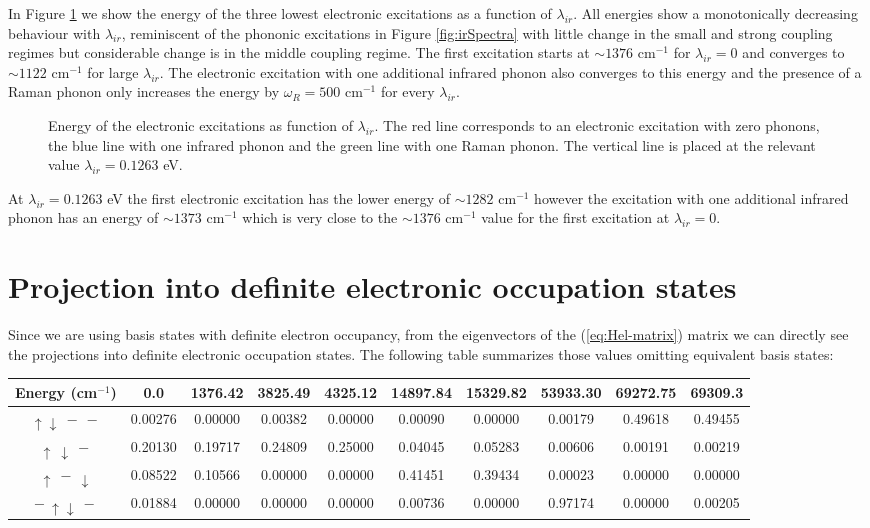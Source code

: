 In Figure \ref{fig:electrSpectra} we show the energy of the three lowest electronic excitations as a function of $\lambda_{ir}$.
All energies show a monotonically decreasing behaviour with $\lambda_{ir}$, reminiscent of the phononic excitations in Figure \ref{fig:irSpectra} with little change in the small and strong coupling regimes but considerable change is in the middle coupling regime.
The first excitation starts at $\sim 1376$ cm$^{-1}$ for $\lambda_{ir}=0$ and converges to $\sim 1122$ cm$^{-1}$ for large $\lambda_{ir}$.
The electronic excitation with one additional infrared phonon also converges to this energy and the presence of a Raman phonon only increases the energy by $\omega_R=500$ cm$^{-1}$ for every $\lambda_{ir}$.
%
\begin{figure}[ht]
  \centering
  
  \caption[Energy of the electronic excitations as function of $\lambda_{ir}$.]
  {Energy of the electronic excitations as function of $\lambda_{ir}$. 
    The red line corresponds to an electronic excitation with zero phonons, the blue line with one infrared phonon and the green line with one Raman phonon.
    The vertical line is placed at the relevant value $\lambda_{ir}=0.1263$ eV.}
  \label{fig:electrSpectra}
\end{figure}

At $\lambda_{ir}=0.1263$ eV the first electronic excitation has the lower energy of $\sim 1282$ cm$^{-1}$ however the excitation with one additional infrared phonon has an energy of $\sim 1373$ cm$^{-1}$ which is very close to the $\sim 1376$ cm$^{-1}$ value for the first excitation at $\lambda_{ir}=0$.

\section{Projection into definite electronic occupation states}

Since we are using basis states with definite electron occupancy, from the eigenvectors of the (\ref{eq:Hel-matrix}) matrix we can directly see the projections into definite electronic occupation states. The following table summarizes those values omitting equivalent basis states:

\noindent\begin{tabular}{| c | c | c | c | c | c | c | c | c | c |}
\hline
Energy (cm$^{-1}$) & 0.0 & 1376.42 & 3825.49 & 4325.12 & 14897.84 & 15329.82 & 53933.30 & 69272.75 & 69309.3 \\
\hline
$\uparrow \downarrow \ - \ -$ & 0.00276 & 0.00000 & 0.00382 & 0.00000 & 0.00090 & 0.00000 & 0.00179 & 0.49618 & 0.49455 \\
$\uparrow\  \downarrow \ -$ & 0.20130 & 0.19717 & 0.24809 & 0.25000 & 0.04045 & 0.05283 & 0.00606 & 0.00191 & 0.00219 \\
$\uparrow \ - \ \downarrow$ & 0.08522 & 0.10566 & 0.00000 & 0.00000 & 0.41451 & 0.39434 & 0.00023 & 0.00000 & 0.00000 \\
$ - \ \uparrow \downarrow \ -$ & 0.01884 & 0.00000 & 0.00000 & 0.00000 & 0.00736 & 0.00000 & 0.97174 & 0.00000 & 0.00205 \\
\hline
\end{tabular}

